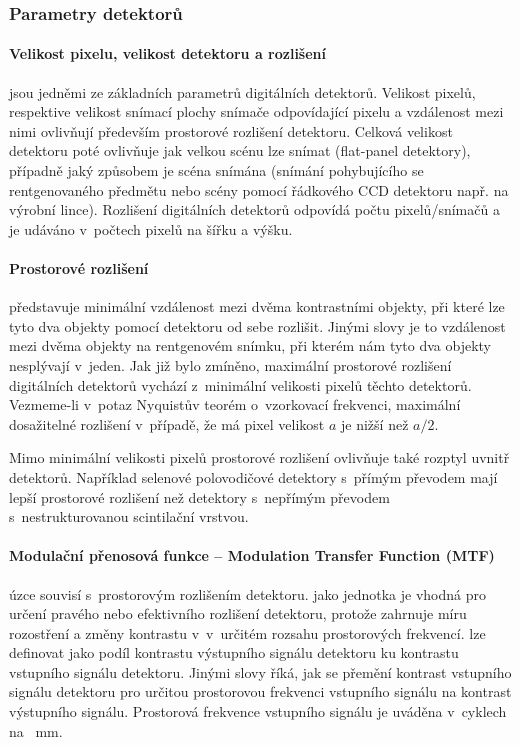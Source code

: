 \subsubsection{Parametry detektorů}
\paragraph{Velikost pixelu, velikost detektoru a rozlišení}
jsou jedněmi ze základních parametrů digitálních detektorů. Velikost pixelů, respektive velikost snímací plochy snímače odpovídající pixelu a vzdálenost mezi nimi ovlivňují především prostorové rozlišení detektoru. \cite[str.~682]{Advances-in-Digital-Radiography} Celková velikost detektoru poté ovlivňuje jak velkou scénu lze snímat (flat-panel detektory), případně jaký způsobem je scéna snímána (snímání pohybujícího se rentgenovaného předmětu nebo scény pomocí řádkového CCD detektoru např. na výrobní lince). Rozlišení digitálních detektorů odpovídá počtu pixelů/snímačů a je udáváno v~počtech pixelů na šířku a výšku.

\paragraph{Prostorové rozlišení}
představuje minimální vzdálenost mezi dvěma kontrastními objekty, při které lze tyto dva objekty pomocí detektoru od sebe rozlišit. \cite[str.~682]{Advances-in-Digital-Radiography} Jinými slovy je to vzdálenost mezi dvěma objekty na rentgenovém snímku, při kterém nám tyto dva objekty nesplývají v~jeden. Jak již bylo zmíněno, maximální prostorové rozlišení digitálních detektorů vychází z~minimální velikosti pixelů těchto detektorů. Vezmeme-li v~potaz Nyquistův teorém o~vzorkovací frekvenci, maximální dosažitelné rozlišení v~případě, že má pixel velikost $a$ je nižší než $a/2$. 

Mimo minimální velikosti pixelů prostorové rozlišení ovlivňuje také rozptyl uvnitř detektorů. Například selenové polovodičové detektory s~přímým převodem mají lepší prostorové rozlišení než detektory s~nepřímým převodem s~nestrukturovanou scintilační vrstvou.

\paragraph{Modulační přenosová funkce -- Modulation Transfer Function (MTF)}
úzce souvisí s~prostorovým rozlišením detektoru.  jako jednotka je vhodná pro určení pravého nebo efektivního rozlišení detektoru, protože zahrnuje míru rozostření a změny kontrastu v~v~určitém rozsahu prostorových frekvencí. lze definovat jako podíl kontrastu výstupního signálu detektoru ku kontrastu vstupního signálu detektoru. \cite{Modulacni-Prenosova-Funkce} Jinými slovy  říká, jak se  přemění kontrast vstupního signálu detektoru pro určitou prostorovou frekvenci vstupního signálu na kontrast výstupního signálu. \cite[str.~682]{Advances-in-Digital-Radiography} Prostorová frekvence vstupního signálu je uváděna v~cyklech na \SI{}{\mm}.

